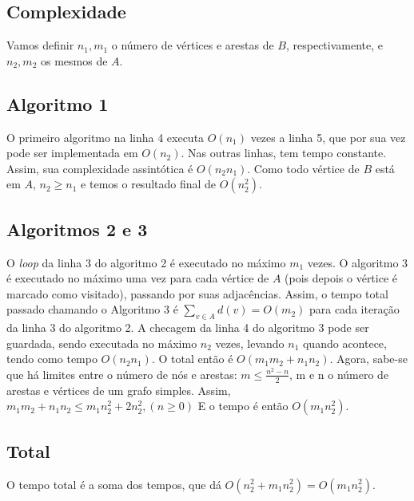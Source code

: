 \documentclass[7pt]{article}
\newcommand{\tit}[1]{\textit{#1}}
\begin{document}
\begin{multicols}{2}
\section{Complexidade}
Vamos definir $n_1, m_1$ o número de vértices e arestas de $B$, respectivamente,
e $n_2, m_2$ os mesmos de $A$.

\subsection{Algoritmo 1}
O primeiro algoritmo na linha 4 executa $O(n_1)$ vezes a linha 5, que por sua
vez pode ser implementada em $O(n_2)$. Nas outras linhas, tem tempo constante.
Assim, sua complexidade assintótica é $O(n_2n_1)$. Como todo vértice de $B$ está
em $A$, $n_2 \ge n_1$ e temos o resultado final de $O(n_{2}^2)$.

\subsection{Algoritmos 2 e 3}
O \tit{loop} da linha 3 do algoritmo 2 é executado no máximo $m_1$ vezes.
O algoritmo 3 é executado no máximo uma vez para cada vértice de $A$ 
(pois depois o vértice é marcado como visitado), passando por suas adjacências. 
Assim, o tempo total passado chamando o Algoritmo 3 é 
$\sum\nolimits_{v \in A}{d(v)} = O(m_2)$ para cada iteração da linha 3 do 
algoritmo 2.
A checagem da linha 4 do algoritmo 3 pode ser guardada, sendo executada
no máximo $n_2$ vezes, levando $n_1$ quando acontece, tendo como tempo
$O(n_2n_1)$.
O total então é $O(m_1m_2 + n_1n_2)$.
Agora, sabe-se que há limites entre o número de nós e arestas:
$m \le \frac{n^2 - n}{2}$, m e n o número de arestas e vértices de um grafo 
simples. Assim, $m_1m_2 + n_1n_2 \le m_1n_{2}^2 + 2n_{2}^2, (n \ge 0)$
E o tempo é então $O(m_1n_{2}^2)$.

\subsection{Total}
O tempo total é a soma dos tempos, que dá $O(n_{2}^2 + m_1n_{2}^2) = 
O(m_1n_{2}^2)$.

\printbibliography

\end{multicols}
\end{document}
